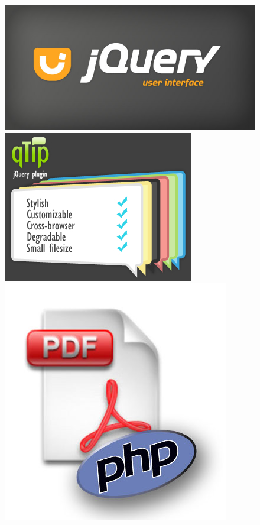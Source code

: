 \documentclass[spanish,xcolor=table,svgnames]{beamer}
\begin{document}
{  \begin{figure}
       \includegraphics[scale=0.2]{jqueryui}\hspace{9mm}
\includegraphics[scale=0.2]{qtip}\hspace{4mm}
\includegraphics[scale=0.2]{fphp}
\end{figure}

}
\end{document}
